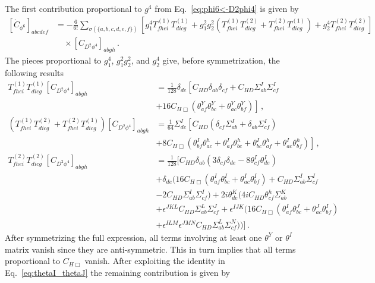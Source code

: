 The first contribution proportional to $g^4$ from Eq.~\eqref{eq:phi6<-D2phi4} is given by
\begin{align}
    \left[\dot C_{\phi^6}\right]_{abcdef} &= - \frac{6}{6!} \sum_{\sigma(\{a,b,c,d,e,f\})}[g_1^4 T^{(1)}_{fhei}T^{(1)}_{dicg} + g_1^2 g_2^2 (T^{(1)}_{fhei}T^{(2)}_{dicg}+T^{(2)}_{fhei}T^{(1)}_{dicg}) +g_2^4 T^{(2)}_{fhei}T^{(2)}_{dicg}]\nonumber \\
    &\quad \times 
    \left[C_{D^2\phi^4}\right]_{abgh}\,.
\end{align}
The pieces proportional to $g_1^4$, $g_1^2g_2^2$, and $g_2^4$  give, before symmetrization, the following results
    \begin{align}
    T^{(1)}_{fhei}T^{(1)}_{dicg} [C_{D^2\phi^4}]_{abgh}&=\frac{1}{128} \delta_{de} \left[C_{HD}\delta_{ab}\delta_{cf}+ C_{HD}\Sigma_{ab}^I\Sigma_{cf}^I\right. \\
    &\left.+ 16 C_{H\Box}\left(\theta^Y_{af}\theta^Y_{bc}+\theta^Y_{ac}\theta^Y_{bf}\right)\right]\,,\nonumber\\
    \left(T^{(1)}_{fhei}T^{(2)}_{dicg} +T^{(2)}_{fhei}T^{(1)}_{dicg}\right)[C_{D^2\phi^4}]_{abgh} &= \frac{1}{64} \Sigma_{de}^I \left[C_{HD}\left(\delta_{cf}\Sigma_{ab}^I + \delta_{ab}\Sigma_{cf}^I\right)\right.\\ &\left.+8C_{H\Box}\left(\theta_{bf}^I\theta_{ac}^h+\theta_{af}^I\theta_{bc}^h+\theta_{bc}^I\theta_{af}^h+\theta_{ac}^I\theta_{bf}^h\right)\right]\,,\nonumber\\
    T^{(2)}_{fhei}T^{(2)}_{dicg} [C_{D^2\phi^4}]_{abgh}&=\frac{1}{128}\Big[C_{HD} \delta _{a b} \left(3 \delta _{c f} \delta _{d e}-8 \theta _{c f}^{I} \theta _{d e}^{I}\right)\\ 
    &+\delta _{d e} \Big( 16 C_{H\Box} \left(\theta _{a f}^{I} \theta _{b c}^{I}+\theta _{a c}^{I} \theta _{b f}^{I}\right) 
    + C_{HD} \Sigma _{a b}^{I}\Sigma _{c f}^{I} \nonumber\\
    & -2C_{HD}\Sigma _{a b}^{I}\Sigma _{c f}^{I} \Big) 
    + 2i\theta _{d e}^{K} \Big( 4iC_{HD} \theta _{c f}^h\Sigma _{a b}^{K}\nonumber\\
    &+ \epsilon ^{J K L} C_{HD}  \Sigma _{a b}^{L} \Sigma _{c f}^{J} + \epsilon ^{I J K} \Big(16 C_{H\Box} \left(\theta _{a f}^{I} \theta _{b c}^{J}+\theta _{a c}^{J} \theta _{b f}^{I}\right)\nonumber\\ 
    &+ \epsilon ^{I L M} \epsilon^{J M N} C_{HD} \Sigma _{a b}^{L} \Sigma _{c f}^{N} \Big) \Big) \Big]\,.\nonumber
    \end{align}
After symmetrizing the full expression, all terms involving at least one $\theta^Y$ or $\theta^I$ matrix vanish since they are anti-symmetric. This in turn implies that all terms proportional to $C_{H\Box}$ vanish. After exploiting the identity in Eq.~\eqref{eq:thetaI_thetaJ} the remaining contribution is given by
